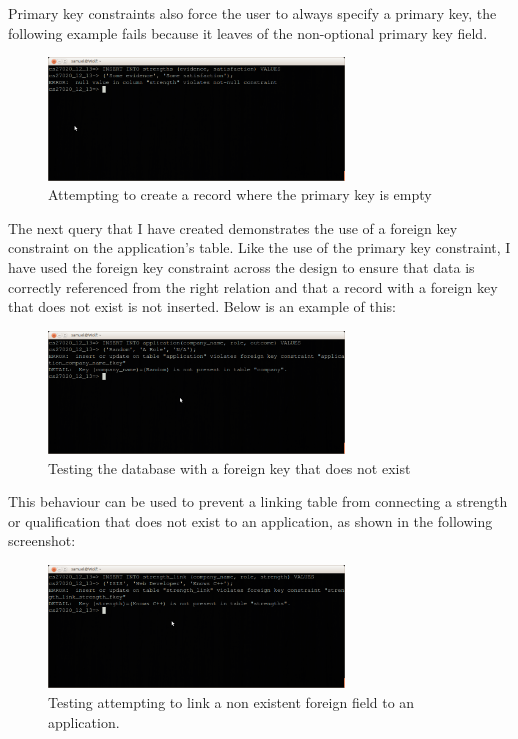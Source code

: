 \documentclass{article}
\begin{document}
Primary key constraints also force the user to always specify a primary key, the following example fails because it leaves of the non-optional primary key field.

\begin{figure}[H]
\centering
\includegraphics[width=0.7\textwidth]{img/test/test-pkey-empty.png}
\caption{Attempting to create a record where the primary key is empty}
\label{fig:test-pkey-empty}
\end{figure}

The next query that I have created demonstrates the use of a foreign key constraint on the application's table. Like the use of the primary key constraint, I have used the foreign key constraint across the design to ensure that data is correctly referenced from the right relation and that a record with a foreign key that does not exist is not inserted. Below is an example of this:

\begin{figure}[H]
\centering
\includegraphics[width=0.7\textwidth]{img/test/test-fkey.png}
\caption{Testing the database with a foreign key that does not exist}
\label{fig:test-fkey}
\end{figure}

This behaviour can be used to prevent a linking table from connecting a strength or qualification that does not exist to an application, as shown in the following screenshot:

\begin{figure}[H]
\centering
\includegraphics[width=0.7\textwidth]{img/test/test-fkey-link.png}
\caption{Testing attempting to link a non existent foreign field to an application.}
\label{fig:test-fkey-link}
\end{figure}
\end{document}
